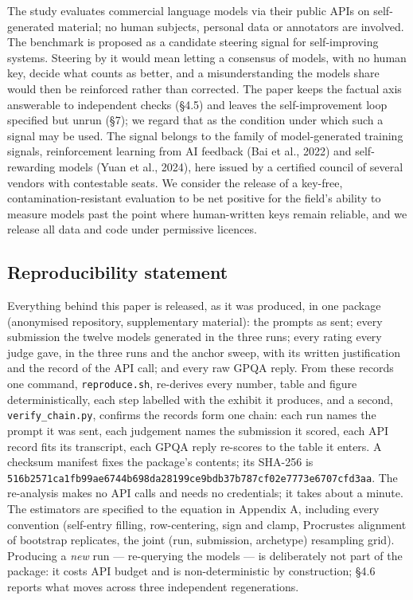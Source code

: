 \documentclass{article}
\begin{document}
The study evaluates commercial language models via their public APIs on self-generated material; no human subjects, personal data or annotators are involved. The benchmark is proposed as a candidate steering signal for self-improving systems. Steering by it would mean letting a consensus of models, with no human key, decide what counts as better, and a misunderstanding the models share would then be reinforced rather than corrected. The paper keeps the factual axis answerable to independent checks (\S{}4.5) and leaves the self-improvement loop specified but unrun (\S{}7); we regard that as the condition under which such a signal may be used. The signal belongs to the family of model-generated training signals, reinforcement learning from AI feedback (Bai et al., 2022) and self-rewarding models (Yuan et al., 2024), here issued by a certified council of several vendors with contestable seats. We consider the release of a key-free, contamination-resistant evaluation to be net positive for the field's ability to measure models past the point where human-written keys remain reliable, and we release all data and code under permissive licences.

\subsection*{Reproducibility statement}

Everything behind this paper is released, as it was produced, in one package (anonymised repository, supplementary material): the prompts as sent; every submission the twelve models generated in the three runs; every rating every judge gave, in the three runs and the anchor sweep, with its written justification and the record of the API call; and every raw GPQA reply. From these records one command, \texttt{reproduce.sh}, re-derives every number, table and figure deterministically, each step labelled with the exhibit it produces, and a second, \texttt{verify\_\allowbreak{}chain.py}, confirms the records form one chain: each run names the prompt it was sent, each judgement names the submission it scored, each API record fits its transcript, each GPQA reply re-scores to the table it enters. A checksum manifest fixes the package's contents; its SHA-256 is \texttt{516b2571ca1fb99ae6744b698da28199ce9bdb37b787cf02e7773e6707cfd3aa}. The re-analysis makes no API calls and needs no credentials; it takes about a minute. The estimators are specified to the equation in Appendix A, including every convention (self-entry filling, row-centering, sign and clamp, Procrustes alignment of bootstrap replicates, the joint (run, submission, archetype) resampling grid). Producing a \emph{new} run --- re-querying the models --- is deliberately not part of the package: it costs API budget and is non-deterministic by construction; \S{}4.6 reports what moves across three independent regenerations.
\end{document}
